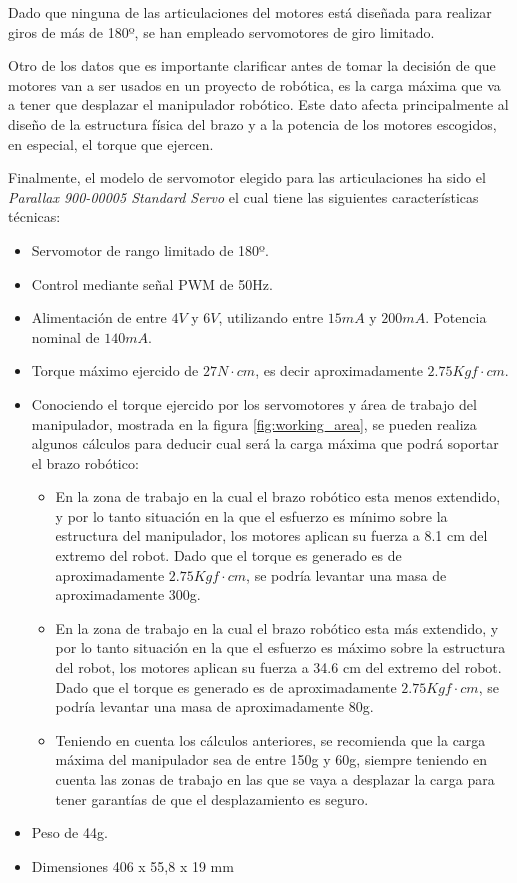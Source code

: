 Dado que ninguna de las articulaciones del motores está diseñada para realizar giros de más de 180º, se han empleado servomotores de giro limitado.

Otro de los datos que es importante clarificar antes de tomar la decisión de que motores van a ser usados en un proyecto de robótica, es la carga máxima que va a tener que desplazar el manipulador robótico. Este dato afecta principalmente al diseño de la estructura física del brazo y a la potencia de los motores escogidos, en especial, el torque que ejercen. 

Finalmente, el modelo de servomotor elegido para las articulaciones ha sido el \textit{Parallax 900-00005 Standard Servo} el cual tiene las siguientes características técnicas:

\begin{itemize}
    \item Servomotor de rango limitado de 180º.
    \item Control mediante señal \ac{PWM} de 50Hz.
    \item Alimentación de entre $4V$ y $6V$, utilizando entre $15mA$ y $200mA$. Potencia nominal de $140mA$.
    \item Torque máximo ejercido de $27N\cdot cm$, es decir aproximadamente $2.75 Kgf\cdot cm$. 
    \item Conociendo el torque ejercido por los servomotores y área de trabajo del manipulador, mostrada en la figura \ref{fig:working_area}, se pueden realiza algunos cálculos para deducir cual será la carga máxima que podrá soportar el brazo robótico:
    \begin{itemize}
        \item En la zona de trabajo en la cual el brazo robótico esta menos extendido, y por lo tanto situación  en la que el esfuerzo es mínimo sobre la estructura del manipulador, los motores aplican su fuerza a 8.1 cm del extremo del robot. Dado que el torque es generado es de aproximadamente $2.75 Kgf\cdot cm$, se podría levantar una masa de aproximadamente 300g.
        
        \item En la zona de trabajo en la cual el brazo robótico esta más extendido, y por lo tanto situación en la que el esfuerzo es máximo sobre la estructura del robot, los motores aplican su fuerza a 34.6 cm del extremo del robot. Dado que el torque es generado es de aproximadamente $2.75 Kgf\cdot cm$, se podría levantar una masa de aproximadamente 80g.
        
        \item Teniendo en cuenta los cálculos anteriores, se recomienda que la carga máxima del manipulador sea de entre 150g y 60g, siempre teniendo en cuenta las zonas de trabajo en las que se vaya a desplazar la carga para tener garantías de que el desplazamiento es seguro.
    \end{itemize}
    \item Peso de 44g.
    \item Dimensiones 406 x 55,8 x 19 mm
\end{itemize}

